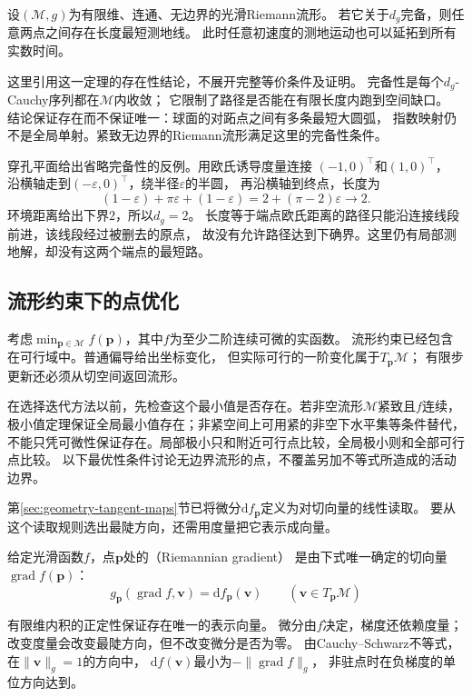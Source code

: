 \begin{theorem}
\label{thm:geometry-hopf-rinow-existence}
设$(\mathcal M,g)$为有限维、连通、无边界的光滑Riemann流形。
若它关于$d_g$完备，则任意两点之间存在长度最短测地线。
此时任意初速度的测地运动也可以延拓到所有实数时间。
\end{theorem}
这里引用这一定理的存在性结论，不展开完整等价条件及证明。
完备性是每个$d_g$-Cauchy序列都在$\mathcal M$内收敛；
它限制了路径是否能在有限长度内跑到空间缺口。
结论保证存在而不保证唯一：球面的对跖点之间有多条最短大圆弧，
指数映射仍不是全局单射。紧致无边界的Riemann流形满足这里的完备性条件。

穿孔平面给出省略完备性的反例。用欧氏诱导度量连接
$(-1,0)^\top$和$(1,0)^\top$，
沿横轴走到$(-\varepsilon,0)^\top$，绕半径$\varepsilon$的半圆，
再沿横轴到终点，长度为
\[
 (1-\varepsilon)+\pi\varepsilon+(1-\varepsilon)
 =2+(\pi-2)\varepsilon\longrightarrow2.
\]
环境距离给出下界$2$，所以$d_g=2$。
长度等于端点欧氏距离的路径只能沿连接线段前进，该线段经过被删去的原点，
故没有允许路径达到下确界。这里仍有局部测地解，却没有这两个端点的最短路。

\subsection{流形约束下的点优化}
\label{sec:geometry-point-optimization}
\label{sec:geometry-manifold-optimization}
\label{sec:geometry-point-optimality}

考虑$\min_{\bm p\in\mathcal M}f(\bm p)$，其中$f$为至少二阶连续可微的实函数。
流形约束已经包含在可行域中。普通偏导给出坐标变化，
但实际可行的一阶变化属于$T_{\bm p}\mathcal M$；
有限步更新还必须从切空间返回流形。


在选择迭代方法以前，先检查这个最小值是否存在。若非空流形$\mathcal M$紧致且$f$连续，
极小值定理保证全局最小值存在；非紧空间上可用紧的非空下水平集等条件替代，
不能只凭可微性保证存在。局部极小只和附近可行点比较，全局极小则和全部可行点比较。
以下最优性条件讨论无边界流形的点，不覆盖另加不等式所造成的活动边界。

第\ref{sec:geometry-tangent-maps}节已将微分$\mathrm df_{\bm p}$定义为对切向量的线性读取。
要从这个读取规则选出最陡方向，还需用度量把它表示成向量。
\begin{definition}[Riemann梯度]
\label{def:geometry-riemannian-gradient}
给定光滑函数$f$，点$\bm p$处的（Riemannian gradient）
是由下式唯一确定的切向量$\operatorname{grad}f(\bm p)$：
\begin{equation}
 g_{\bm p}(\operatorname{grad}f,\bm v)=\mathrm df_{\bm p}(\bm v)
 \qquad(\bm v\in T_{\bm p}\mathcal M)
 \label{eq:geometry-riemannian-gradient-definition}
\end{equation}
\end{definition}
有限维内积的正定性保证存在唯一的表示向量。
微分由$f$决定，梯度还依赖度量；改变度量会改变最陡方向，但不改变微分是否为零。
由Cauchy--Schwarz不等式，在$\lVert\bm v\rVert_g=1$的方向中，
$\mathrm df(\bm v)$最小为$-\lVert\operatorname{grad}f\rVert_g$，
非驻点时在负梯度的单位方向达到。


